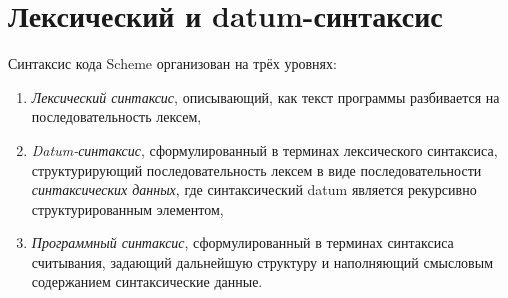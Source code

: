 \chapter{Лексический и datum-синтаксис}
\label{readsyntaxchapter}

Синтаксис кода Scheme организован на трёх уровнях:\vspace{-3mm}
%
\begin{enumerate}
\item \textit{Лексический синтаксис}, описывающий, как текст программы разбивается на
  последовательность лексем,
\item \textit{Datum-синтаксис}, сформулированный в терминах лексического синтаксиса,
структурирующий последовательность лексем в виде последовательности \textit{синтаксических
  данных}, где
синтаксический datum является рекурсивно структурированным элементом,
\item \textit{Программный синтаксис}, сформулированный в терминах синтаксиса считывания, задающий
  дальнейшую структуру и наполняющий смысловым содержанием синтаксические данные.
\end{enumerate}\vspace{-3mm}
%
